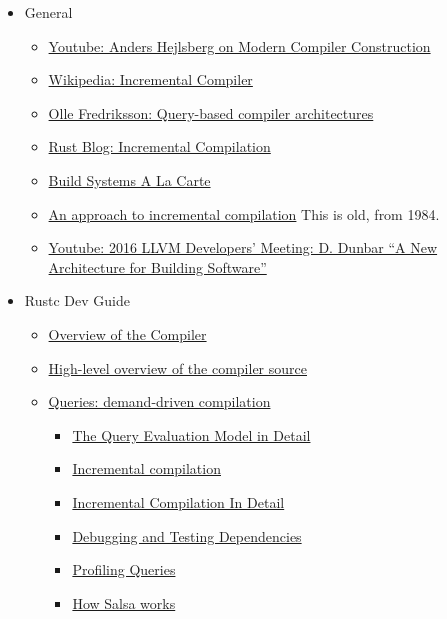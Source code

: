 \documentclass[12pt, a4paper]{report}
\begin{document}
\begin{itemize}[noitemsep]

\item General
	\begin{itemize}[noitemsep]
	\item \href{https://www.youtube.com/watch?v=wSdV1M7n4gQ}{\CheckedBox Youtube: Anders Hejlsberg on Modern Compiler Construction}
	\item \href{https://en.wikipedia.org/wiki/Incremental_compiler}{\CheckedBox Wikipedia: Incremental Compiler}
	\item \href{https://ollef.github.io/blog/posts/query-based-compilers.html}{\CheckedBox Olle Fredriksson: Query-based compiler architectures}
	\item \href{https://blog.rust-lang.org/2016/09/08/incremental.html}{\CheckedBox Rust Blog: Incremental Compilation}
	\item \href{https://www.microsoft.com/en-us/research/publication/build-systems-la-carte/}{\Square Build Systems A La Carte}
  \item \href{https://dl.acm.org/doi/10.1145/502949.502889}{\CheckedBox An approach to incremental compilation}
    This is old, from 1984.
	\item \href{https://www.youtube.com/watch?v=b_T-eCToX1I}{\Square Youtube: 2016 LLVM Developers’ Meeting: D. Dunbar “A New Architecture for Building Software”}
	\end{itemize}

\item Rustc Dev Guide
	\begin{itemize}[noitemsep]
	\item \href{https://rustc-dev-guide.rust-lang.org/overview.html}{\Square Overview of the Compiler}
	\item \href{https://rustc-dev-guide.rust-lang.org/compiler-src.html}{\Square High-level overview of the compiler source}
	\item \href{https://rustc-dev-guide.rust-lang.org/query.html}{\Square Queries: demand-driven compilation}
		\begin{itemize}[noitemsep]
		\item \href{https://rustc-dev-guide.rust-lang.org/queries/query-evaluation-model-in-detail.html}{\Square The Query Evaluation Model in Detail}
		\item \href{https://rustc-dev-guide.rust-lang.org/queries/incremental-compilation.html}{\Square Incremental compilation}
		\item \href{https://rustc-dev-guide.rust-lang.org/queries/incremental-compilation-in-detail.html}{\Square Incremental Compilation In Detail}
		\item \href{https://rustc-dev-guide.rust-lang.org/incrcomp-debugging.html}{\Square Debugging and Testing Dependencies}
		\item \href{https://rustc-dev-guide.rust-lang.org/queries/profiling.html}{\Square Profiling Queries}
		\item \href{https://rustc-dev-guide.rust-lang.org/salsa.html}{\Square How Salsa works}
		\end{itemize}
	\end{itemize}


\end{itemize}
\end{document}

